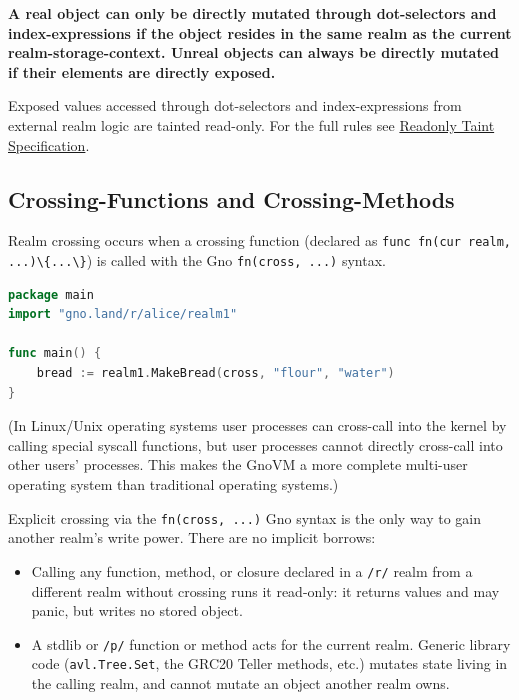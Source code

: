 \documentclass[12pt,a4paper]{article}
\newcommand{\passthrough}[1]{#1}
\begin{document}
\textbf{A real object can only be directly mutated through dot-selectors
and index-expressions if the object resides in the same realm as the
current realm-storage-context. Unreal objects can always be directly
mutated if their elements are directly exposed.}

Exposed values accessed through dot-selectors and index-expressions from
external realm logic are tainted read-only. For the full rules see
\hyperref[readonly-taint-specification]{Readonly Taint Specification}.

\subsection{Crossing-Functions and
Crossing-Methods}\label{crossing-functions-and-crossing-methods}

Realm crossing occurs when a crossing function (declared as
\passthrough{\lstinline!func fn(cur realm, ...)\{...\}!}) is called with
the Gno \passthrough{\lstinline!fn(cross, ...)!} syntax.

\begin{lstlisting}[language=Go]
package main
import "gno.land/r/alice/realm1"

func main() {
    bread := realm1.MakeBread(cross, "flour", "water")
}
\end{lstlisting}

(In Linux/Unix operating systems user processes can cross-call into the
kernel by calling special syscall functions, but user processes cannot
directly cross-call into other users' processes. This makes the GnoVM a
more complete multi-user operating system than traditional operating
systems.)

Explicit crossing via the \passthrough{\lstinline!fn(cross, ...)!} Gno
syntax is the only way to gain another realm's write power. There are no
implicit borrows:

\begin{itemize}
\item Calling any function, method, or closure declared in a
\passthrough{\lstinline!/r/!} realm from a different realm without
crossing runs it read-only: it returns values and may panic, but writes
no stored object.
\item A stdlib or \passthrough{\lstinline!/p/!} function or method acts
for the current realm. Generic library code
(\passthrough{\lstinline!avl.Tree.Set!}, the GRC20 Teller methods, etc.)
mutates state living in the calling realm, and cannot mutate an object
another realm owns.
\end{itemize}
\end{document}

